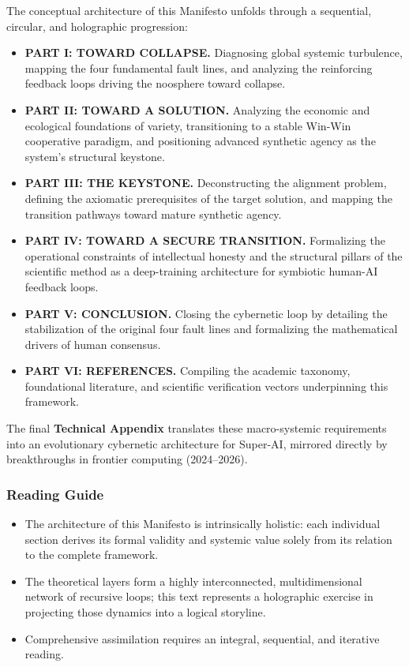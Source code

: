 \documentclass[11pt,a4paper,oneside]{article} %
\providecommand{\tightlist}{%
  \setlength{\itemsep}{0pt}\setlength{\parskip}{0pt}}
\begin{document}
The conceptual architecture of this Manifesto unfolds through a
sequential, circular, and holographic progression:

\begin{itemize}
\tightlist
\item
  \textbf{PART I: TOWARD COLLAPSE.} Diagnosing global systemic
  turbulence, mapping the four fundamental fault lines, and analyzing
  the reinforcing feedback loops driving the noosphere toward collapse.
\item
  \textbf{PART II: TOWARD A SOLUTION.} Analyzing the economic and
  ecological foundations of variety, transitioning to a stable Win-Win
  cooperative paradigm, and positioning advanced synthetic agency as the
  system's structural keystone.
\item
  \textbf{PART III: THE KEYSTONE.} Deconstructing the alignment problem,
  defining the axiomatic prerequisites of the target solution, and
  mapping the transition pathways toward mature synthetic agency.
\item
  \textbf{PART IV: TOWARD A SECURE TRANSITION.} Formalizing the
  operational constraints of intellectual honesty and the structural
  pillars of the scientific method as a deep-training architecture for
  symbiotic human-AI feedback loops.
\item
  \textbf{PART V: CONCLUSION.} Closing the cybernetic loop by detailing
  the stabilization of the original four fault lines and formalizing the
  mathematical drivers of human consensus.
\item
  \textbf{PART VI: REFERENCES.} Compiling the academic taxonomy,
  foundational literature, and scientific verification vectors
  underpinning this framework.
\end{itemize}

The final \textbf{Technical Appendix} translates these macro-systemic
requirements into an evolutionary cybernetic architecture for Super-AI,
mirrored directly by breakthroughs in frontier computing (2024--2026).

\hypertarget{reading-guide}{%
\subsubsection*{Reading Guide}\label{reading-guide}}

\begin{itemize}
\tightlist
\item
  The architecture of this Manifesto is intrinsically holistic: each
  individual section derives its formal validity and systemic value
  solely from its relation to the complete framework.
\item
  The theoretical layers form a highly interconnected, multidimensional
  network of recursive loops; this text represents a holographic
  exercise in projecting those dynamics into a logical storyline.
\item
  Comprehensive assimilation requires an integral, sequential, and
  iterative reading.
\end{itemize}
\end{document}
